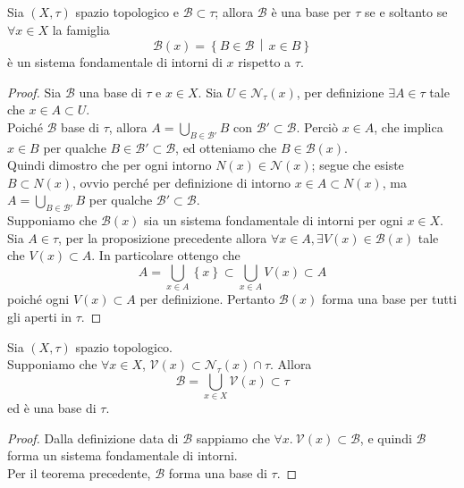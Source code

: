 \begin{theorem}
	Sia $(X,\tau)$ spazio topologico e $\mathcal{B} \subset \tau$; allora $\mathcal{B}$ è una base per $\tau$ se e soltanto se $\forall x \in X$ la famiglia 
	\begin{equation*}
	\mathcal{B}(x) = \left\{B \in \mathcal{B} \,\middle|\, x \in B \right\}
	\end{equation*}
	è un sistema fondamentale di intorni di $x$ rispetto a $\tau$.
\end{theorem}
\begin{proof}
	Sia $\mathcal{B}$ una base di $\tau$ e $x \in X$. Sia $U \in \mathcal{N}_\tau(x)$, per definizione $\exists A \in \tau$ tale che $x \in A \subset U$. \\ Poiché $\mathcal{B}$ base di $\tau$, allora $A = \bigcup_{B \in \mathcal{B}'} B$ con $\mathcal{B}' \subset \mathcal{B}$. Perciò $x \in A$, che implica $x \in B$ per qualche $B \in \mathcal{B}' \subset \mathcal{B}$, ed otteniamo che $B \in \mathcal{B}(x)$. \\ Quindi dimostro che per ogni intorno $N(x) \in \mathcal{N}(x)$; segue che esiste $B \subset N(x)$, ovvio perché per definizione di intorno $x \in A \subset N(x)$, ma $A = \bigcup_{B \in \mathcal{B}'} B$ per qualche $\mathcal{B}' \subset \mathcal{B}$.\\  	
	Supponiamo che $\mathcal{B}(x)$ sia un sistema fondamentale di intorni per ogni $x \in X$. Sia $A \in \tau$, per la proposizione precedente allora $\forall x \in A, \exists V(x) \in \mathcal{B}(x)$ tale che $V(x) \subset A$. In particolare ottengo che
	\begin{equation*}
		A = \bigcup_{x \in A} \left\{x\right\} \subset \bigcup_{x \in A} V(x) \subset A
	\end{equation*} 
	poiché ogni $V(x) \subset A$ per definizione. Pertanto $\mathcal{B}(x)$ forma una base per tutti gli aperti in $\tau$.
\end{proof}

\begin{corollary}
	\label{crl:base_from_sfi}
	Sia $(X,\tau)$ spazio topologico. \\ Supponiamo che $\forall x \in X$, $\mathcal{V}(x) \subset \mathcal{N}_\tau(x) \cap \tau$. Allora 
	\begin{equation*}
		\mathcal{B} = \bigcup_{x \in X} \mathcal{V}(x) \subset \tau
	\end{equation*}
	ed è una base di $\tau$.
\end{corollary}
\begin{proof}
	Dalla definizione data di $\mathcal{B}$ sappiamo che $\forall x . \ \mathcal{V}(x) \subset \mathcal{B}$, e quindi $\mathcal{B}$ forma un sistema fondamentale di intorni. \\ Per il teorema precedente, $\mathcal{B}$ forma una base di $\tau$.
\end{proof}

